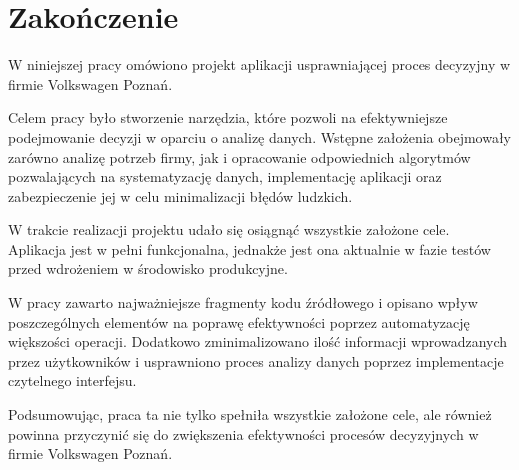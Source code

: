 \chapter{Zakończenie}

W niniejszej pracy omówiono projekt aplikacji usprawniającej proces decyzyjny w firmie Volkswagen Poznań.

Celem pracy było stworzenie narzędzia, które pozwoli na efektywniejsze podejmowanie decyzji w oparciu o analizę danych. Wstępne założenia obejmowały zarówno analizę potrzeb firmy, jak i opracowanie odpowiednich algorytmów pozwalających na systematyzację danych, implementację aplikacji oraz zabezpieczenie jej w celu minimalizacji błędów ludzkich.

W trakcie realizacji projektu udało się osiągnąć wszystkie założone cele. Aplikacja jest w pełni funkcjonalna, jednakże jest ona aktualnie w fazie testów przed wdrożeniem w środowisko produkcyjne.

W pracy zawarto najważniejsze fragmenty kodu źródłowego i opisano wpływ poszczególnych elementów na poprawę efektywności poprzez automatyzację większości operacji. Dodatkowo zminimalizowano ilość informacji wprowadzanych przez użytkowników i usprawniono proces analizy danych poprzez implementacje czytelnego interfejsu.

Podsumowując, praca ta nie tylko spełniła wszystkie założone cele, ale również powinna przyczynić się do zwiększenia efektywności procesów decyzyjnych w firmie Volkswagen Poznań.
